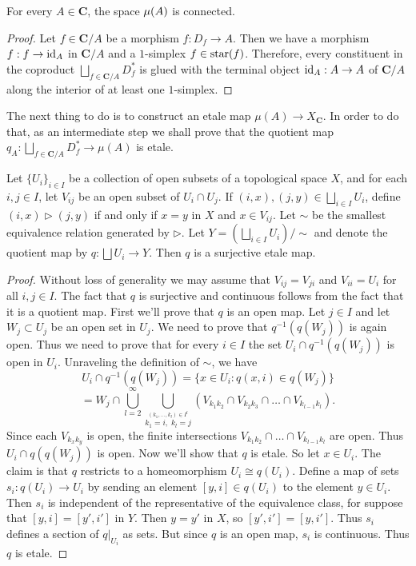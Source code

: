 \begin{lemma}
\label{lem:ST is connected for every object A}
For every $A \in \mathbf{C}$, the space $\operatorname{\mu}(A)$ is connected.
\end{lemma}
\begin{proof}
Let $f \in \mathbf{C}/A$ be a morphism $f : D_f \to A$. Then we have a morphism $f : f \to \operatorname{id}_A$ in $\mathbf{C}/A$ and a $1$-simplex $f \in \operatorname{star}(f)$. Therefore, every constituent in the coproduct $\bigsqcup_{f \in \mathbf{C}/A} D_f^*$ is glued with the terminal object $\operatorname{id}_A : A \to A$ of $\mathbf{C}/A$ along the interior of at least one $1$-simplex.
\end{proof}

The next thing to do is to construct an etale map $\mu(A) \to X_{\mathbf{C}}$. In order to do that, as an intermediate step we shall prove that the quotient map $q_A : \bigsqcup_{f \in \mathbf{C}/A} D_f^* \to \mu(A)$ is etale.

\begin{lemma}
\label{lem:abstract gluing lemma showing that the quotient map is etale}
Let $\{U_i\}_{i \in I}$ be a collection of open subsets of a topological space $X$, and for each $i,j \in I$, let $V_{ij}$ be an open subset of $U_{i} \cap U_{j}$. If $(i,x), (j,y) \in \bigsqcup_{i \in I} U_i$, define $(i,x) \rhd (j,y)$ if and only if $x=y$ in $X$ and $x \in V_{ij}$. Let $\sim$ be the smallest equivalence relation generated by $\rhd$. Let $Y = \left (\bigsqcup_{i \in I} U_i \right) / \sim$ and denote the quotient map by $q : \bigsqcup U_i \to Y$. Then $q$ is a surjective etale map.
\end{lemma}
\begin{proof}
Without loss of generality we may assume that $V_{ij} = V_{ji}$ and $V_{ii} = U_i$ for all $i,j \in I$.
The fact that $q$ is surjective and continuous follows from the fact that it is a quotient map. First we'll prove that $q$ is an open map.
Let $j \in I$ and let $W_j \subset U_j$ be an open set in $U_j$. We need to prove that $q^{-1}(q(W_j))$ is again open. Thus we need to prove that for every $i \in I$ the set $U_i \cap q^{-1}(q(W_j))$ is open in $U_i$. Unraveling the definition of $\sim$, we have
\[ U_i \cap q^{-1}(q(W_j)) = \{x \in U_i : q(x,i) \in q(W_j)\} \]
\[ = W_j \cap \bigcup_{l=2}^\infty \bigcup_{\stackrel{(k_1,\ldots,k_l) \in I^l}{k_1 = i,\; k_l = j}} \left( V_{k_1 k_2} \cap V_{k_2 k_3} \cap \ldots \cap V_{k_{l-1} k_l} \right). \]
Since each $V_{k_x k_y}$ is open, the finite intersections $V_{k_1 k_2} \cap \ldots \cap V_{k_{l-1} k_l}$ are open. Thus $U_i \cap q(q(W_j))$ is open.
Now we'll show that $q$ is etale. So let $x \in U_i$. The claim is that $q$ restricts to a homeomorphism $U_i \cong q(U_i)$. Define a map of sets $s_i : q(U_i) \to U_i$ by sending an element $[y,i] \in q(U_i)$ to the element $y \in U_i$. Then $s_i$ is independent of the representative of the equivalence class, for suppose that $[y,i] = [y',i']$ in $Y$. Then $y=y'$ in $X$, so $[y',i'] = [y,i']$. Thus $s_i$ defines a section of $q|_{U_i}$ as sets. But since $q$ is an open map, $s_i$ is continuous. Thus $q$ is etale.
\end{proof}

